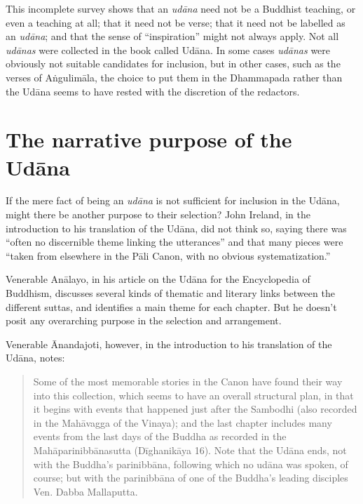\documentclass[12pt,openany]{book}%
\begin{document}
This incomplete survey shows that an \textit{\textsanskrit{udāna}} need not be a Buddhist teaching, or even a teaching at all; that it need not be verse; that it need not be labelled as an \textit{\textsanskrit{udāna}}; and that the sense of “inspiration” might not always apply. Not all \textit{\textsanskrit{udānas}} were collected in the book called \textsanskrit{Udāna}. In some cases \textit{\textsanskrit{udānas}} were obviously not suitable candidates for inclusion, but in other cases, such as the verses of \textsanskrit{Aṅgulimāla}, the choice to put them in the Dhammapada rather than the \textsanskrit{Udāna} seems to have rested with the discretion of the redactors. 

\section*{The narrative purpose of the \textsanskrit{Udāna}}

If the mere fact of being an \textit{\textsanskrit{udāna}} is not sufficient for inclusion in the \textsanskrit{Udāna}, might there be another purpose to their selection? John Ireland, in the introduction to his translation of the \textsanskrit{Udāna}, did not think so, saying there was “often no discernible theme linking the utterances” and that many pieces were “taken from elsewhere in the \textsanskrit{Pāli} Canon, with no obvious systematization.”

Venerable \textsanskrit{Anālayo}, in his article on the \textsanskrit{Udāna} for the Encyclopedia of Buddhism, discusses several kinds of thematic and literary links between the different suttas, and identifies a main theme for each chapter. But he doesn’t posit any overarching purpose in the selection and arrangement.

Venerable Ānandajoti, however, in the introduction to his translation of the \textsanskrit{Udāna}, notes:

\begin{quotation}%
Some of the most memorable stories in the Canon have found their way into this collection, which seems to have an overall structural plan, in that it begins with events that happened just after the Sambodhi (also recorded in the \textsanskrit{Mahāvagga} of the Vinaya); and the last chapter includes many events from the last days of the Buddha as recorded in the \textsanskrit{Mahāparinibbānasutta} (\textsanskrit{Dīghanikāya} 16). Note that the \textsanskrit{Udāna} ends, not with the Buddha’s \textsanskrit{parinibbāna}, following which no \textsanskrit{udāna} was spoken, of course; but with the \textsanskrit{parinibbāna} of one of the Buddha’s leading disciples Ven. Dabba Mallaputta.

%
\end{quotation}
\end{document}
